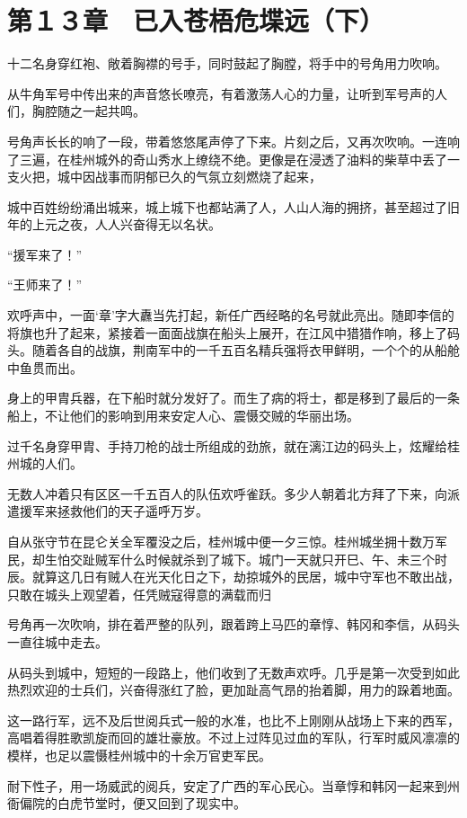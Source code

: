 \section{第１３章　已入苍梧危堞远（下）}

十二名身穿红袍、敞着胸襟的号手，同时鼓起了胸膛，将手中的号角用力吹响。

从牛角军号中传出来的声音悠长嘹亮，有着激荡人心的力量，让听到军号声的人们，胸腔随之一起共鸣。

号角声长长的响了一段，带着悠悠尾声停了下来。片刻之后，又再次吹响。一连响了三遍，在桂州城外的奇山秀水上缭绕不绝。更像是在浸透了油料的柴草中丢了一支火把，城中因战事而阴郁已久的气氛立刻燃烧了起来，

城中百姓纷纷涌出城来，城上城下也都站满了人，人山人海的拥挤，甚至超过了旧年的上元之夜，人人兴奋得无以名状。

“援军来了！”

“王师来了！”

欢呼声中，一面‘章’字大纛当先打起，新任广西经略的名号就此亮出。随即李信的将旗也升了起来，紧接着一面面战旗在船头上展开，在江风中猎猎作响，移上了码头。随着各自的战旗，荆南军中的一千五百名精兵强将衣甲鲜明，一个个的从船舱中鱼贯而出。

身上的甲胄兵器，在下船时就分发好了。而生了病的将士，都是移到了最后的一条船上，不让他们的影响到用来安定人心、震慑交贼的华丽出场。

过千名身穿甲胄、手持刀枪的战士所组成的劲旅，就在漓江边的码头上，炫耀给桂州城的人们。

无数人冲着只有区区一千五百人的队伍欢呼雀跃。多少人朝着北方拜了下来，向派遣援军来拯救他们的天子遥呼万岁。

自从张守节在昆仑关全军覆没之后，桂州城中便一夕三惊。桂州城坐拥十数万军民，却生怕交趾贼军什么时候就杀到了城下。城门一天就只开巳、午、未三个时辰。就算这几日有贼人在光天化日之下，劫掠城外的民居，城中守军也不敢出战，只敢在城头上观望着，任凭贼寇得意的满载而归

号角再一次吹响，排在着严整的队列，跟着跨上马匹的章惇、韩冈和李信，从码头一直往城中走去。

从码头到城中，短短的一段路上，他们收到了无数声欢呼。几乎是第一次受到如此热烈欢迎的士兵们，兴奋得涨红了脸，更加趾高气昂的抬着脚，用力的跺着地面。

这一路行军，远不及后世阅兵式一般的水准，也比不上刚刚从战场上下来的西军，高唱着得胜歌凯旋而回的雄壮豪放。不过上过阵见过血的军队，行军时威风凛凛的模样，也足以震慑桂州城中的十余万官吏军民。

耐下性子，用一场威武的阅兵，安定了广西的军心民心。当章惇和韩冈一起来到州衙偏院的白虎节堂时，便又回到了现实中。

